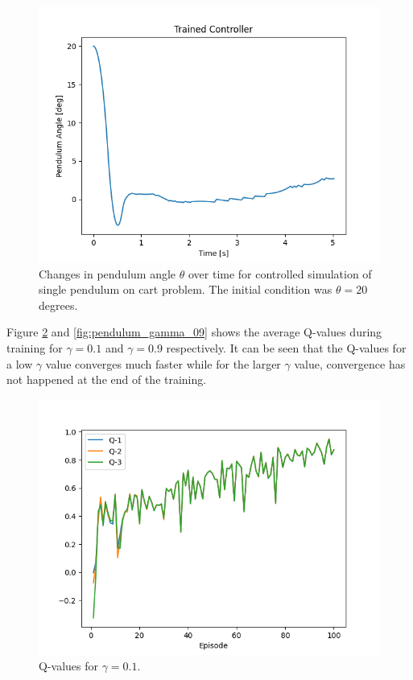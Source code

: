 \documentclass[final]{LTHtwocol} %
\begin{document}
\begin{figure}[htp]
	\centering
	\includegraphics[width=0.9\columnwidth]{figures/Pendulum_angle_20.png}
	\caption{Changes in pendulum angle $\theta$ over time for controlled simulation of single pendulum on cart problem. The initial condition was $\theta = 20$ degrees.}
	\label{fig:single_pendulum_outside_training_domain}
\end{figure}
Figure \ref{fig:pendulum_gamma_01} and \ref{fig:pendulum_gamma_09} shows the average Q-values during training for $\gamma=0.1$ and $\gamma=0.9$ respectively. It can be seen that the Q-values for a low $\gamma$ value converges much faster while for the larger $\gamma$ value, convergence has not happened at the end of the training.
\begin{figure}[htp]
	\centering
	\includegraphics[width=0.9\columnwidth]{figures/Pendulum_q_gamma_01.png}
	\caption{Q-values for $\gamma=0.1$.}
	\label{fig:pendulum_gamma_01}
\end{figure} 
\end{document}
